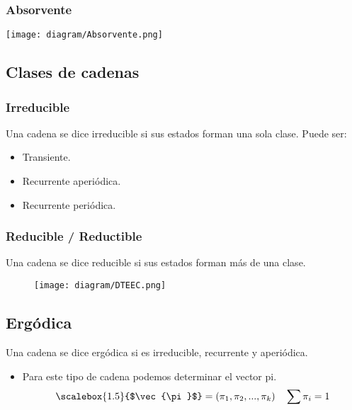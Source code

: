\documentclass{templateNote}
\begin{document}
\subsubsection{Absorvente}
\begin{center}
    \texttt{[image: diagram/Absorvente.png]}
\end{center}

\newpage
\subsection{Clases de cadenas}
\subsubsection{Irreducible}
Una cadena se dice irreducible si sus estados forman una sola clase.
Puede ser:
\begin{itemize}
    \item Transiente.
    \item Recurrente aperi\'odica.
    \item Recurrente peri\'odica.
\end{itemize}
\subsubsection{Reducible / Reductible}
Una cadena se dice reducible si sus estados forman m\'as de una clase.
\begin{figure}[H]
    \centering
    \texttt{[image: diagram/DTEEC.png]}
\end{figure}
\subsection{Erg\'odica}
Una cadena se dice erg\'odica si es irreducible, recurrente y aperi\'odica.
\begin{itemize}
    \item Para este tipo de cadena podemos determinar el vector pi.
    \begin{equation*}
        \scalebox{1.5}{$\vec{\pi}$} = \left(\pi_1, \pi_2, ..., \pi_k\right) \quad \sum{\pi_i} = 1
    \end{equation*}
\end{itemize}
\end{document}
